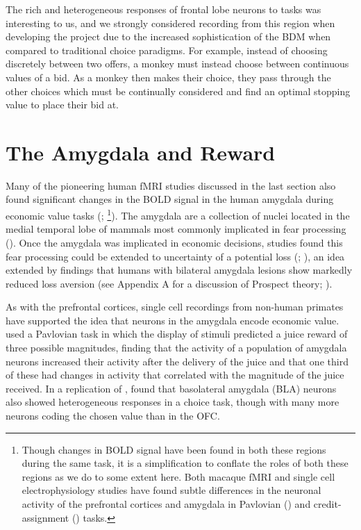The rich and heterogeneous responses of frontal lobe neurons to tasks was interesting to us, and we strongly considered recording from this region when developing the project due to the increased sophistication of the BDM when compared to traditional choice paradigms. For example, instead of choosing discretely between two offers, a monkey must instead choose between continuous values of a bid. As a monkey then makes their choice, they pass through the other choices which must be continually considered and find an optimal stopping value to place their bid at.

\section{The Amygdala and Reward}

Many of the pioneering human fMRI studies discussed in the last section also found significant changes in the BOLD signal in the human amygdala during economic value tasks (\cite{breiterFunctionalImagingNeural2001}; \cite{odohertyAbstractRewardPunishment2001}\footnote{Though changes in BOLD signal have been found in both these regions during the same task, it is a simplification to conflate the roles of both these regions as we do to some extent here. Both macaque fMRI and single cell electrophysiology studies have found subtle differences in the neuronal activity of the prefrontal cortices and amygdala in Pavlovian (\cite{saezDistinctRolesAmygdala2017}) and credit-assignment (\cite{chauContrastingRolesOrbitofrontal2015}) tasks.}). The amygdala are a collection of nuclei located in the medial temporal lobe of mammals most commonly implicated in fear processing (\cite{ledouxAmygdala2007}). Once the amygdala was implicated in economic decisions, studies found this fear processing could be extended to uncertainty of a potential loss (\cite{hsuNeuralSystemsResponding2005}; \cite{kahnRoleAmygdalaSignaling2002}), an idea extended by findings that humans with bilateral amygdala lesions show markedly reduced loss aversion (see Appendix A for a discussion of Prospect theory; \cite{demartinoNeurobiologyReferenceDependentValue2009}).

As with the prefrontal cortices, single cell recordings from non-human primates have supported the idea that neurons in the amygdala encode economic value. \cite{bermudezRewardMagnitudeCoding2010} used a Pavlovian task in which the display of stimuli predicted a juice reward of three possible magnitudes, finding that the activity of a population of amygdala neurons increased their activity after the delivery of the juice and that one third of these had changes in activity that correlated with the magnitude of the juice received. In a replication of \cite{padoaschioppaNeuronsOrbitofrontalCortex2006}, \cite{jezziniNeuronalActivityPrimate2020} found that basolateral amygdala (BLA) neurons also showed heterogeneous responses in a choice task, though with many more neurons coding the chosen value than in the OFC.

